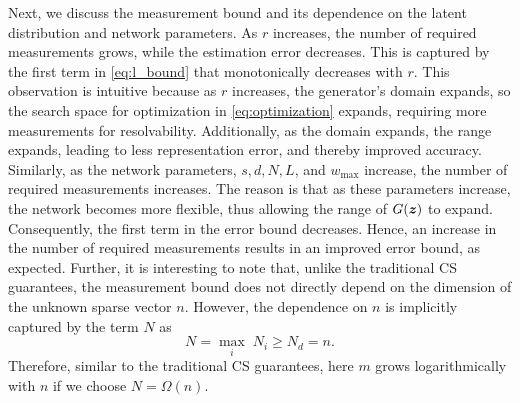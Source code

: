 \documentclass[journal]{IEEEtran}
\begin{document}
Next, we discuss the measurement bound and its dependence on the latent distribution and network parameters. As $r$ increases, the number of required measurements grows, while the estimation error decreases. This is captured by the first term in \eqref{eq:l_bound} that monotonically decreases with $r$. This observation is intuitive because as $r$ increases, the generator’s domain expands, so the search space for optimization in \eqref{eq:optimization} expands, requiring more measurements for resolvability. Additionally, as the domain expands, the range expands, leading to less representation error, and thereby improved accuracy. Similarly, as the network parameters, $s,d,N,L$, and $w_{\max}$ increase, the number of required measurements increases. The reason is that as these parameters increase, the network becomes more flexible, thus allowing the range of $G(\boldsymbol{z})$ to expand. Consequently, the first term in the error bound decreases. Hence, an increase in the number of required measurements results in an improved error bound, as expected. Further, it is interesting to note that, unlike the traditional CS guarantees, the measurement bound does not directly depend on the dimension of the unknown sparse vector $n$. However, the dependence on $n$ is implicitly captured by the term $N$ as 
\begin{equation}
N=\max_i\;N_i\geq N_d=n.    
\end{equation}
Therefore, similar to the traditional CS guarantees, here $m$ grows logarithmically with $n$ if we choose $N=\Omega(n)$. 
\end{document}
